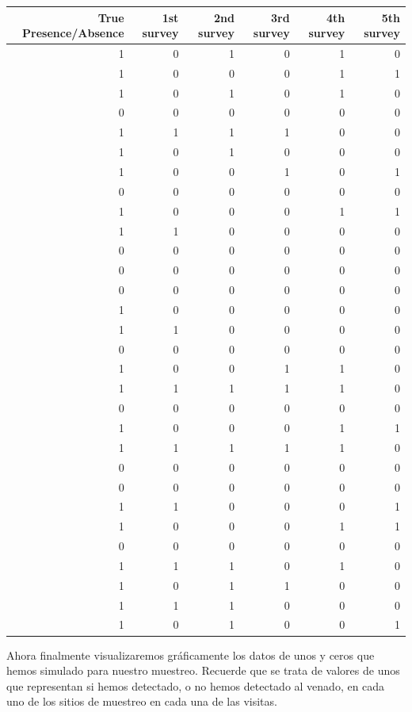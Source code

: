 \documentclass[
]{book}
\begin{document}
\begin{tabular}{r|r|r|r|r|r}
\hline
True Presence/Absence & 1st survey & 2nd survey & 3rd survey & 4th survey & 5th survey\\
\hline
1 & 0 & 1 & 0 & 1 & 0\\
\hline
1 & 0 & 0 & 0 & 1 & 1\\
\hline
1 & 0 & 1 & 0 & 1 & 0\\
\hline
0 & 0 & 0 & 0 & 0 & 0\\
\hline
1 & 1 & 1 & 1 & 0 & 0\\
\hline
1 & 0 & 1 & 0 & 0 & 0\\
\hline
1 & 0 & 0 & 1 & 0 & 1\\
\hline
0 & 0 & 0 & 0 & 0 & 0\\
\hline
1 & 0 & 0 & 0 & 1 & 1\\
\hline
1 & 1 & 0 & 0 & 0 & 0\\
\hline
0 & 0 & 0 & 0 & 0 & 0\\
\hline
0 & 0 & 0 & 0 & 0 & 0\\
\hline
0 & 0 & 0 & 0 & 0 & 0\\
\hline
1 & 0 & 0 & 0 & 0 & 0\\
\hline
1 & 1 & 0 & 0 & 0 & 0\\
\hline
0 & 0 & 0 & 0 & 0 & 0\\
\hline
1 & 0 & 0 & 1 & 1 & 0\\
\hline
1 & 1 & 1 & 1 & 1 & 0\\
\hline
0 & 0 & 0 & 0 & 0 & 0\\
\hline
1 & 0 & 0 & 0 & 1 & 1\\
\hline
1 & 1 & 1 & 1 & 1 & 0\\
\hline
0 & 0 & 0 & 0 & 0 & 0\\
\hline
0 & 0 & 0 & 0 & 0 & 0\\
\hline
1 & 1 & 0 & 0 & 0 & 1\\
\hline
1 & 0 & 0 & 0 & 1 & 1\\
\hline
0 & 0 & 0 & 0 & 0 & 0\\
\hline
1 & 1 & 1 & 0 & 1 & 0\\
\hline
1 & 0 & 1 & 1 & 0 & 0\\
\hline
1 & 1 & 1 & 0 & 0 & 0\\
\hline
1 & 0 & 1 & 0 & 0 & 1\\
\hline
\end{tabular}

Ahora finalmente visualizaremos gráficamente los datos de unos y ceros que hemos simulado para nuestro muestreo. Recuerde que se trata de valores de unos que representan si hemos detectado, o no hemos detectado al venado, en cada uno de los sitios de muestreo en cada una de las visitas.
\end{document}
